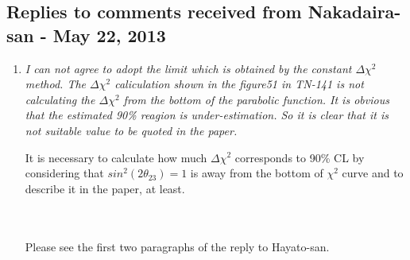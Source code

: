 \subsection{Replies to comments received from Nakadaira-san - May 22, 2013}

\begin{enumerate}
\vspace{5 mm}
\item
{\em
  I can not agree to adopt the limit which is obtained by the constant
  $\Delta \chi^2$ method. The $\Delta \chi^2$ caliculation shown in the figure51
  in TN-141 is not calculating the $\Delta \chi^2$ from the bottom of the
  parabolic function. It is obvious that the estimated 90\% reagion is 
  under-estimation.  So it is clear that it is not suitable value to 
  be quoted in the paper.

  It is necessary to calculate how much $\Delta \chi^2$ corresponds to 90\%
  CL by considering that $sin^2(2\theta_{23})=1$ is away from the bottom of
  $\chi^2$ curve and to describe it in the paper, at least.
}\\
\\
Please see the first two paragraphs of the reply to Hayato-san. 

\end{enumerate}
